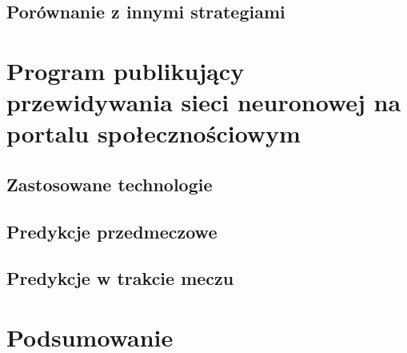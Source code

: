 \section{Porównanie z innymi strategiami}

\chapter{Program publikujący przewidywania sieci neuronowej na portalu społecznościowym}
\section{Zastosowane technologie}
\section{Predykcje przedmeczowe}
\section{Predykcje w trakcie meczu}

\chapter{Podsumowanie}

